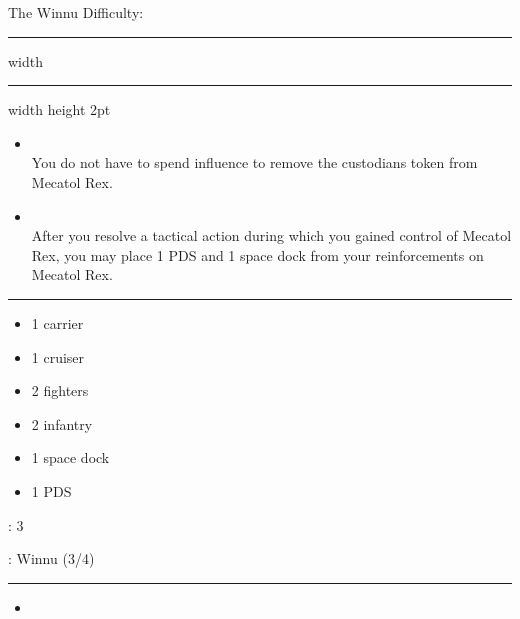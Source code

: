 {\handel\Huge The Winnu} \hfill {\Large Difficulty: \medium} \vspace{-4pt}\\
\hrule width \hsize \kern 1mm \hrule width \hsize height 2pt


\begin{multicols}{2}


\begin{itemize}
\item {}\\
You do not have to spend influence to remove the custodians token from Mecatol Rex.
\item {}\\
After you resolve a tactical action during which you gained control of Mecatol Rex, you may place 1 PDS and 1 space dock from your reinforcements on Mecatol Rex.
\end{itemize}


\vspace{-10pt}\rule{\hsize}{0.4pt}\vspace{5pt}


\vspace{-5pt}
\begin{multicols}{2}
\begin{itemize}
\item 1 carrier
\item 1 cruiser
\item 2 fighters
\item 2 infantry
\item 1 space dock
\item 1 PDS
\end{itemize}
\end{multicols}

\vspace{-5pt}
: 3

\vspace{2pt}
: Winnu (3/4)

\rule{\hsize}{0.4pt}\vspace{5pt}


\begin{itemize}
\item {}
\end{itemize}


\end{multicols}
